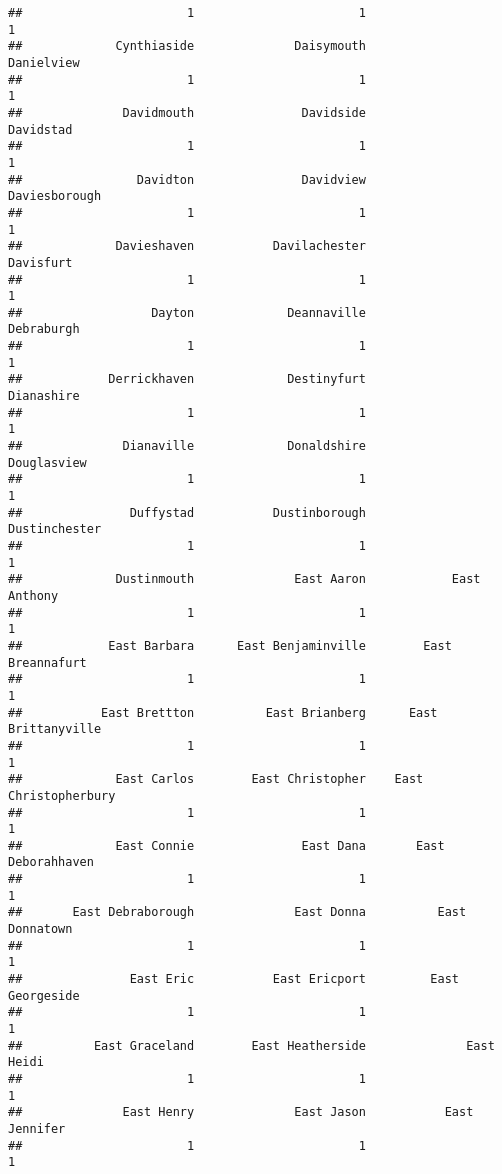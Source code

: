 \documentclass[
]{article}
\begin{document}
\begin{verbatim}
##                       1                       1                       1 
##             Cynthiaside              Daisymouth              Danielview 
##                       1                       1                       1 
##              Davidmouth               Davidside               Davidstad 
##                       1                       1                       1 
##                Davidton               Davidview           Daviesborough 
##                       1                       1                       1 
##             Davieshaven           Davilachester               Davisfurt 
##                       1                       1                       1 
##                  Dayton             Deannaville              Debraburgh 
##                       1                       1                       1 
##            Derrickhaven             Destinyfurt              Dianashire 
##                       1                       1                       1 
##              Dianaville             Donaldshire             Douglasview 
##                       1                       1                       1 
##               Duffystad           Dustinborough           Dustinchester 
##                       1                       1                       1 
##             Dustinmouth              East Aaron            East Anthony 
##                       1                       1                       1 
##            East Barbara      East Benjaminville        East Breannafurt 
##                       1                       1                       1 
##           East Brettton          East Brianberg      East Brittanyville 
##                       1                       1                       1 
##             East Carlos        East Christopher    East Christopherbury 
##                       1                       1                       1 
##             East Connie               East Dana       East Deborahhaven 
##                       1                       1                       1 
##       East Debraborough              East Donna          East Donnatown 
##                       1                       1                       1 
##               East Eric           East Ericport         East Georgeside 
##                       1                       1                       1 
##          East Graceland        East Heatherside              East Heidi 
##                       1                       1                       1 
##              East Henry              East Jason           East Jennifer 
##                       1                       1                       1 

\end{verbatim}
\end{document}
